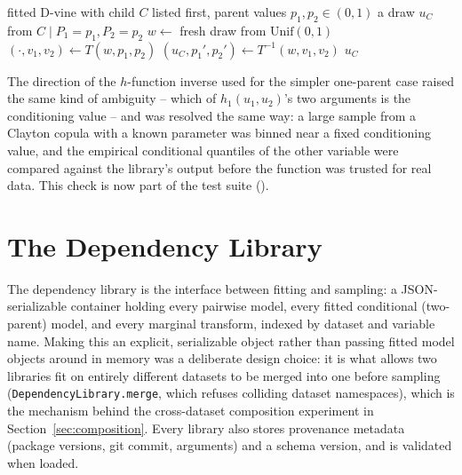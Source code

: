 \documentclass[
  english,
  class=report,
  accentcolor=2c,
  marginpar=false,
  parskip=half-,
  fontsize=11pt,
  ruledheaders=false,
  pdfa=false,
  IMRAD=false,
  thesis={type=master}
]{tudapub}
\begin{document}
\begin{algorithm}
\caption{Conditional sampling of a two-parent child via a D-vine}
\label{alg:conditional}
\begin{algorithmic}[1]
\Require fitted D-vine with child $C$ listed first, parent values $p_1, p_2 \in (0,1)$
\Ensure a draw $u_C$ from $C \mid P_1{=}p_1, P_2{=}p_2$
\State $w \gets$ fresh draw from $\text{Unif}(0,1)$
\State $(\cdot, v_1, v_2) \gets T(w, p_1, p_2)$ 
\State $(u_C, p_1', p_2') \gets T^{-1}(w, v_1, v_2)$ 
\State \Return $u_C$
\end{algorithmic}
\end{algorithm}

The direction of the $h$-function inverse used for the simpler one-parent
case raised the same kind of ambiguity -- which of $h_1(u_1,u_2)$'s two
arguments is the conditioning value -- and was resolved the same way: a
large sample from a Clayton copula with a known parameter was binned near a
fixed conditioning value, and the empirical conditional quantiles of the
other variable were compared against the library's output before the
function was trusted for real data. This check is now part of the test
suite
().

\section{The Dependency Library}
The dependency library is the interface between fitting and sampling: a
JSON-serializable container holding every pairwise model, every fitted
conditional (two-parent) model, and every marginal transform, indexed by
dataset and variable name. Making this an explicit, serializable object
rather than passing fitted model objects around in memory was a deliberate
design choice: it is what allows two libraries fit on entirely different
datasets to be merged into one before sampling
(\texttt{DependencyLibrary.merge}, which refuses colliding dataset
namespaces), which is the mechanism behind the cross-dataset composition
experiment in Section~\ref{sec:composition}. Every library also stores
provenance metadata (package versions, git commit, arguments) and a schema
version, and is validated when loaded.
\end{document}
